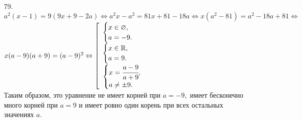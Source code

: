 79. $a^2(x-1)=9(9x+9-2a)\Leftrightarrow a^2x-a^2=81x+81-18a\Leftrightarrow x(a^2-81)=a^2-18a+81\Leftrightarrow$\\$
x(a-9)(a+9)=(a-9)^2\Leftrightarrow\left[\begin{array}{l}\begin{cases} x\in\varnothing,\\ a=-9.\end{cases}\\
\begin{cases} x\in\mathbb{R},\\ a=9.\end{cases}\\\begin{cases} x=\cfrac{a-9}{a+9},\\ a\neq\pm9.\end{cases}\end{array}\right.$\\
Таким образом, это уравнение не имеет корней при $a=-9,$ имеет бесконечно много корней при $a=9$ и имеет ровно один корень при всех остальных значениях $a.$\\
